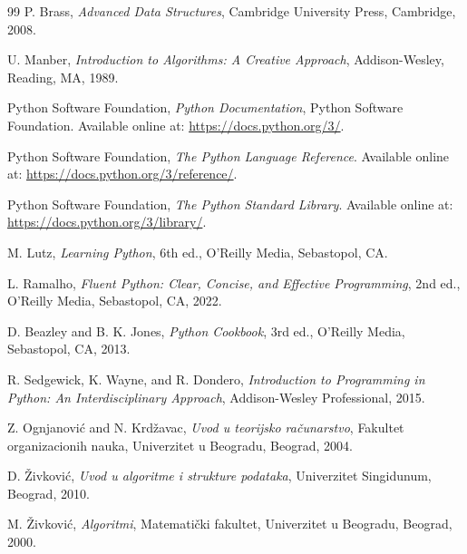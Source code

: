\documentclass[b5paper, utf8, 11pt, colorlinks]{book}
\begin{document}
\begin{thebibliography}{99}
	P. Brass,
	\textit{Advanced Data Structures},
	Cambridge University Press, Cambridge, 2008.
	
	U. Manber,
	\textit{Introduction to Algorithms: A Creative Approach},
	Addison-Wesley, Reading, MA, 1989.
	
	
	Python Software Foundation,
	\textit{Python Documentation},
	Python Software Foundation.
	Available online at:
	\url{https://docs.python.org/3/}.
	
	Python Software Foundation,
	\textit{The Python Language Reference}.
	Available online at:
	\url{https://docs.python.org/3/reference/}.
	
	Python Software Foundation,
	\textit{The Python Standard Library}.
	Available online at:
	\url{https://docs.python.org/3/library/}.
	
	M. Lutz,
	\textit{Learning Python},
	6th ed.,
	O'Reilly Media, Sebastopol, CA.
	
	L. Ramalho,
	\textit{Fluent Python: Clear, Concise, and Effective Programming},
	2nd ed.,
	O'Reilly Media, Sebastopol, CA, 2022.
	
	D. Beazley and B. K. Jones,
	\textit{Python Cookbook},
	3rd ed.,
	O'Reilly Media, Sebastopol, CA, 2013.
	
	R. Sedgewick, K. Wayne, and R. Dondero,
	\textit{Introduction to Programming in Python:
		An Interdisciplinary Approach},
	Addison-Wesley Professional, 2015.
	
	
	Z. Ognjanović and N. Krdžavac,
	\textit{Uvod u teorijsko računarstvo},
	Fakultet organizacionih nauka,
	Univerzitet u Beogradu, Beograd, 2004.
	
	D. Živković,
	\textit{Uvod u algoritme i strukture podataka},
	Univerzitet Singidunum, Beograd, 2010.
	
	M. Živković,
	\textit{Algoritmi},
	Matematički fakultet,
	Univerzitet u Beogradu, Beograd, 2000.
	

\end{thebibliography}
\end{document}
